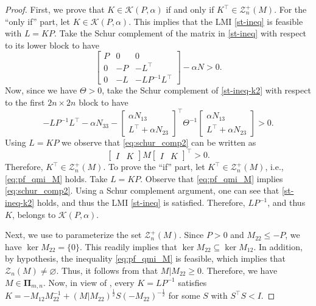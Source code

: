 \documentclass[9pt,shortpaper,twoside,web]{ieeecolor}
\newcommand{\bbma}{\begin{bmatrix}}
\newcommand{\ebma}{\end{bmatrix}}
\newcommand{\mac}[1]{\mathcal{#1}}
\begin{document}
\begin{proof}
First, we prove that $K \in \mac{K}(P,\alpha)$ if and only if \mbox{$K^\top \in \mac{Z}^+_n(M)$}. For the ``only if'' part, let $K \in \mac{K}(P,\alpha)$. This implies that the LMI \eqref{st-ineq} is feasible with $L=KP$. Take the Schur complement of the matrix in \eqref{st-ineq} with respect to its lower block to have
\begin{equation}
\bbma 
P & 0 & 0 \\ 
0 & -P & - L^\top \\ 
0 & - L & -LP^{-1}L^\top 
\ebma -\alpha N > 0.
\label{st-ineq-k2}
\end{equation}
Now, since we have $\Theta>0$, take the Schur complement of \eqref{st-ineq-k2} with respect to the first $2n\times 2n$ block to have
\begin{equation}
\label{eq:schur_comp2}
-LP^{-1}L^\top - \alpha N_{33}-\begin{bmatrix}
\alpha N_{13} \\ L^\top\!\!+\alpha N_{23}
\end{bmatrix}^{\!\top}\!\!\Theta^{-1}\! \begin{bmatrix}
\alpha N_{13} \\ L^\top\!\!+\alpha N_{23}
\end{bmatrix}\!>\!0.
\end{equation}
Using $L=KP$ we observe that \eqref{eq:schur_comp2} can be written as
\begin{equation}
\label{eq:pf_qmi_M}
\begin{bmatrix}
I & K
\end{bmatrix} M\begin{bmatrix}
I & K
\end{bmatrix}^\top> 0.
\end{equation}
Therefore, $K^\top\in\mathcal{Z}^+_n(M)$. To prove the ``if'' part, let \mbox{$K^\top\in\mathcal{Z}^+_n(M)$}, i.e., \eqref{eq:pf_qmi_M} holds. Take $L=KP$. Observe that \eqref{eq:pf_qmi_M} implies \eqref{eq:schur_comp2}. Using a Schur complement argument, one can see that \eqref{st-ineq-k2} holds, and thus the LMI \eqref{st-ineq} is satisfied. Therefore, $LP^{-1}$, and thus $K$, belongs to $\mathcal{K}(P,\alpha)$. 

Next, we use \cite[Thm. 3.3]{HenkQMI2023} to parameterize the set $\mac{Z}^+_n(M)$. Since $P > 0$ and \mbox{$M_{22}\leq -P$}, we have \mbox{$\ker M_{22}=\{0\}$}. This readily implies that \mbox{$\ker M_{22} \subseteq \ker M_{12}$}. In addition, by hypothesis, the inequality \eqref{eq:pf_qmi_M} is feasible, which implies that $\mac{Z}_n (M) \neq \varnothing$. Thus, it follows from \cite[pp. 6,7]{HenkQMI2023} that \mbox{$M|M_{22}\geq 0$}. Therefore, we have $M \in \pmb{\Pi}_{m,n}$. Now, in view of \cite[Thm. 3.3]{HenkQMI2023}, every $K=LP^{-1}$ satisfies \mbox{$K=-M_{12}M_{22}^{-1}+(M|M_{22})^{\frac{1}{2}}S(-M_{22})^{-\frac{1}{2}}$} for some $S$ with $S^\top S < I$.
\end{proof}
\end{document}
